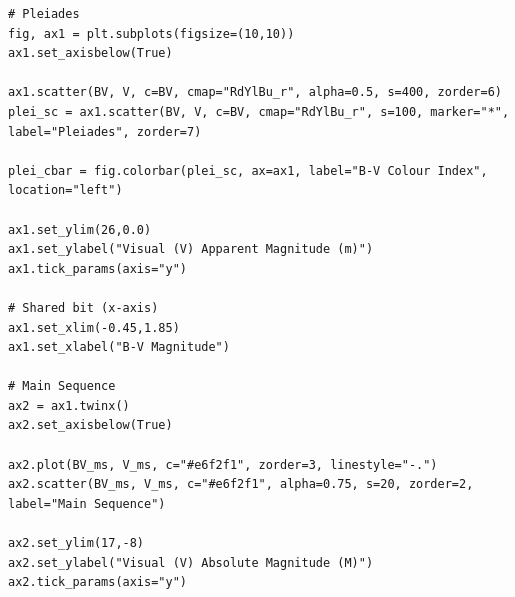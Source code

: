 \documentclass[12pt]{article}
\begin{document}
%

\begin{minipage}{\linewidth}
\captionsetup{hypcap=false}

\begin{mintedbox}
\begin{verbatim}
# Pleiades
fig, ax1 = plt.subplots(figsize=(10,10))
ax1.set_axisbelow(True)

ax1.scatter(BV, V, c=BV, cmap="RdYlBu_r", alpha=0.5, s=400, zorder=6)
plei_sc = ax1.scatter(BV, V, c=BV, cmap="RdYlBu_r", s=100, marker="*", label="Pleiades", zorder=7)

plei_cbar = fig.colorbar(plei_sc, ax=ax1, label="B-V Colour Index", location="left")

ax1.set_ylim(26,0.0)
ax1.set_ylabel("Visual (V) Apparent Magnitude (m)")
ax1.tick_params(axis="y")

# Shared bit (x-axis)
ax1.set_xlim(-0.45,1.85)
ax1.set_xlabel("B-V Magnitude")

# Main Sequence
ax2 = ax1.twinx()
ax2.set_axisbelow(True)

ax2.plot(BV_ms, V_ms, c="#e6f2f1", zorder=3, linestyle="-.")
ax2.scatter(BV_ms, V_ms, c="#e6f2f1", alpha=0.75, s=20, zorder=2, label="Main Sequence")

ax2.set_ylim(17,-8)
ax2.set_ylabel("Visual (V) Absolute Magnitude (M)")
ax2.tick_params(axis="y")

\end{verbatim}
\end{mintedbox}

\end{minipage}
\end{document}
